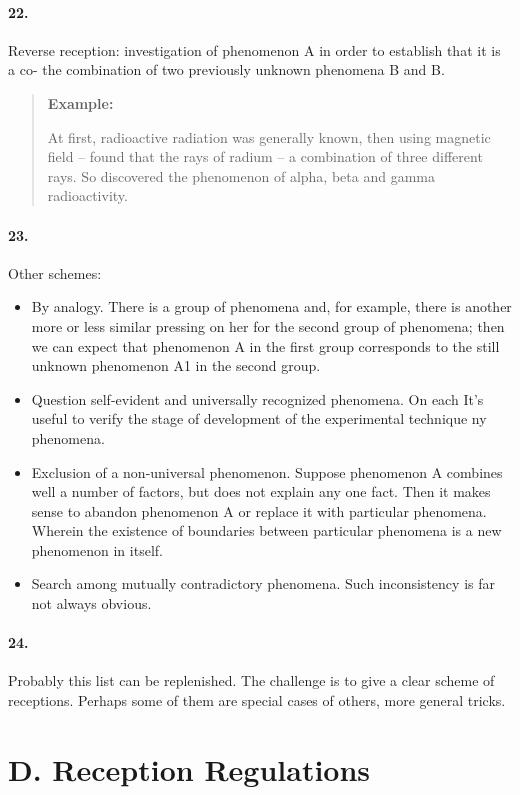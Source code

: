 \documentclass[11pt,a4paper]{article}
\newenvironment{example}{\begin{quote} \textbf{Example:}\par }{\end{quote}}
\begin{document}
\paragraph{22.}
Reverse reception: investigation of phenomenon A in order to establish that it
is a co- the combination of two previously unknown phenomena B and B.

\begin{example}
  At first, radioactive radiation was generally known, then using magnetic
  field -- found that the rays of radium -- a combination of three different
  rays.  So discovered the phenomenon of alpha, beta and gamma radioactivity.
\end{example}
\paragraph{23.}
Other schemes:
\begin{itemize}
\item By analogy. There is a group of phenomena and, for example, there is
  another more or less similar pressing on her for the second group of
  phenomena; then we can expect that phenomenon A in the first group
  corresponds to the still unknown phenomenon A1 in the second group.
\item Question self-evident and universally recognized phenomena. On each It’s
  useful to verify the stage of development of the experimental technique ny
  phenomena.
\item Exclusion of a non-universal phenomenon. Suppose phenomenon A combines
  well a number of factors, but does not explain any one fact. Then it makes
  sense to abandon phenomenon A or replace it with particular
  phenomena. Wherein the existence of boundaries between particular phenomena
  is a new phenomenon in itself.
\item Search among mutually contradictory phenomena. Such inconsistency is far
  not always obvious.
\end{itemize}

\paragraph{24.}
Probably this list can be replenished. The challenge is to give a clear
scheme of receptions. Perhaps some of them are special cases of others,
more general tricks.

\section*{D. Reception Regulations}
\end{document}
